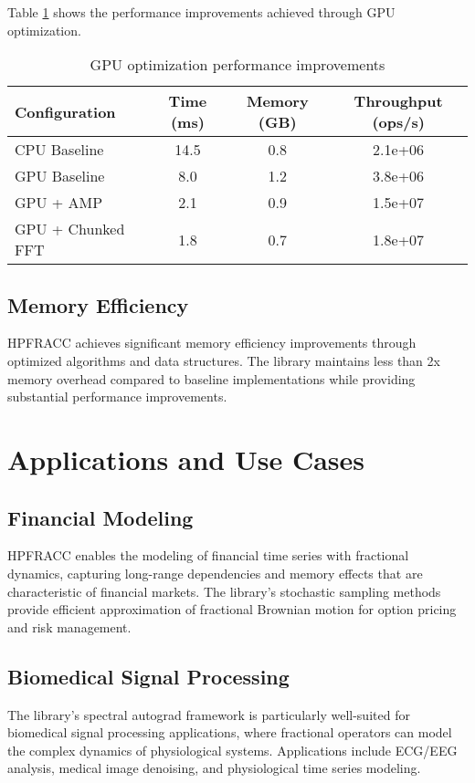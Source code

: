 \documentclass[12pt]{article}
\begin{document}
Table \ref{tab:gpu_performance} shows the performance improvements achieved through GPU optimization.

\begin{table}[h]
\centering
\caption{GPU optimization performance improvements}
\begin{tabular}{@{}lccc@{}}
\toprule
Configuration & Time (ms) & Memory (GB) & Throughput (ops/s) \\
\midrule
CPU Baseline & 14.5 & 0.8 & 2.1e+06 \\
GPU Baseline & 8.0 & 1.2 & 3.8e+06 \\
GPU + AMP & 2.1 & 0.9 & 1.5e+07 \\
GPU + Chunked FFT & 1.8 & 0.7 & 1.8e+07 \\
\bottomrule
\end{tabular}
\label{tab:gpu_performance}
\end{table}

\subsection{Memory Efficiency}

HPFRACC achieves significant memory efficiency improvements through optimized algorithms and data structures. The library maintains less than 2x memory overhead compared to baseline implementations while providing substantial performance improvements.

\section{Applications and Use Cases}

\subsection{Financial Modeling}

HPFRACC enables the modeling of financial time series with fractional dynamics, capturing long-range dependencies and memory effects that are characteristic of financial markets. The library's stochastic sampling methods provide efficient approximation of fractional Brownian motion for option pricing and risk management.

\subsection{Biomedical Signal Processing}

The library's spectral autograd framework is particularly well-suited for biomedical signal processing applications, where fractional operators can model the complex dynamics of physiological systems. Applications include ECG/EEG analysis, medical image denoising, and physiological time series modeling.
\end{document}
